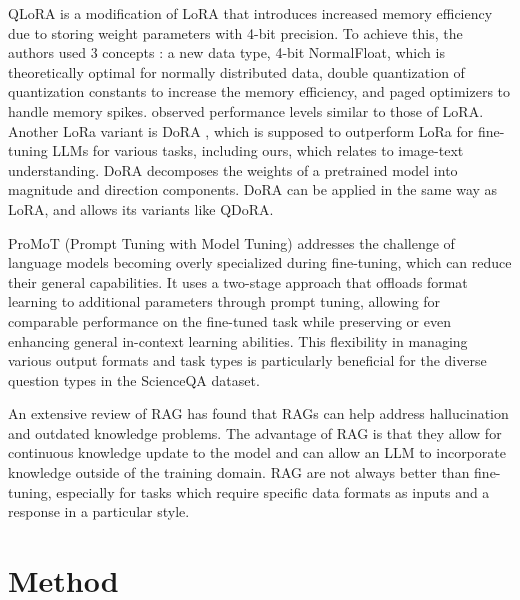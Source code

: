 \documentclass{article}
\begin{document}
QLoRA \cite{qlora} is a modification of LoRA that introduces increased memory efficiency due to storing weight parameters with 4-bit precision. To achieve this, the authors used 3 concepts : a new data type, 4-bit NormalFloat, which is theoretically optimal for normally distributed data, double quantization of quantization constants to increase the memory efficiency, and paged optimizers to handle memory spikes. \cite{qlora} observed performance levels similar to those of LoRA. Another LoRa variant is DoRA \cite{dora}, which is supposed to outperform LoRa for fine-tuning LLMs for various tasks, including ours, which relates to image-text understanding. DoRA decomposes the weights of a pretrained model into magnitude and direction components. DoRA can be applied in the same way as LoRA, and allows its variants like QDoRA.\par

ProMoT (Prompt Tuning with Model Tuning) \cite{valizadehaslani2022twostagefinetuningnovelstrategy} addresses the challenge of language models becoming overly specialized during fine-tuning, which can reduce their general capabilities. It uses a two-stage approach that offloads format learning to additional parameters through prompt tuning, allowing for comparable performance on the fine-tuned task while preserving or even enhancing general in-context learning abilities. This flexibility in managing various output formats and task types is particularly beneficial for the diverse question types in the ScienceQA dataset.\par

An extensive review of RAG \cite{ragreview} has found that RAGs can help address hallucination and outdated knowledge problems. The advantage of RAG is that they allow for continuous knowledge update to the model and can allow an LLM to incorporate knowledge outside of the training domain. RAG are not always better than fine-tuning, especially for tasks which require specific data formats as inputs and a response in a particular style.\par



\section{Method}
\label{sec:method}
\end{document}
